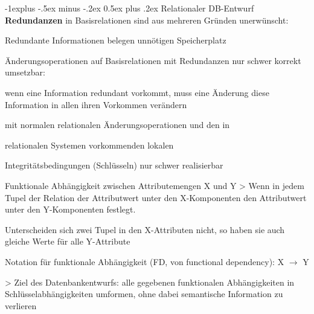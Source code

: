 \documentclass[a4paper]{article}
\makeatletter
\renewcommand{\subsection}{\@startsection{subsection}{2}{0mm}%
                                {-1explus -.5ex minus -.2ex}%
                                {0.5ex plus .2ex}%
                                {\normalfont\normalsize\bfseries}}
\makeatother
\begin{document}
\begin{multicols}{3}
\subsection{Relationaler DB-Entwurf}
\textbf{Redundanzen} in Basisrelationen sind aus mehreren Gründen unerwünscht:
\begin{itemize*}
    \item Redundante Informationen belegen unnötigen Speicherplatz
    \item Änderungsoperationen auf Basisrelationen mit Redundanzen nur schwer korrekt umsetzbar:
    \begin{itemize*}
        \item wenn eine Information redundant vorkommt, muss eine Änderung diese Information in allen ihren Vorkommen verändern
        \item mit normalen relationalen Änderungsoperationen und den in
        \item relationalen Systemen vorkommenden lokalen
        \item Integritätsbedingungen (Schlüsseln) nur schwer realisierbar
    \end{itemize*}
\end{itemize*}

Funktionale Abhängigkeit zwischen Attributemengen X und Y
> Wenn in jedem Tupel der Relation der Attributwert unter den X-Komponenten den Attributwert unter den Y-Komponenten festlegt.
\begin{itemize*}
    \item Unterscheiden sich zwei Tupel in den X-Attributen nicht, so haben sie auch gleiche Werte für alle Y-Attribute
    \item Notation für funktionale Abhängigkeit (FD, von functional dependency): X $\rightarrow$ Y
\end{itemize*}

> Ziel des Datenbankentwurfs: alle gegebenen funktionalen Abhängigkeiten in Schlüsselabhängigkeiten umformen, ohne dabei semantische Information zu verlieren


\end{multicols}
\end{document}
